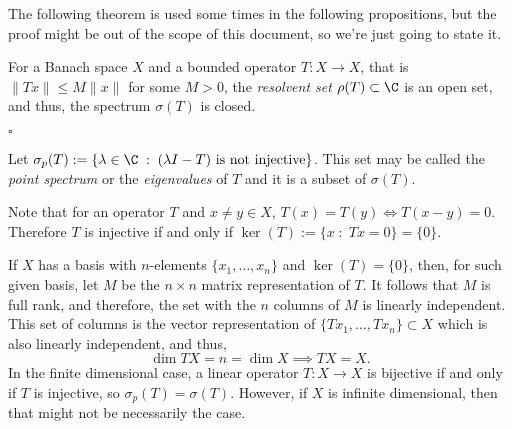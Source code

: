 The following theorem is used some times in the following propositions, but the proof might be out of the scope of this document, so we're just going to state it.

\begin{theorem}
    For a Banach space $X$ and a bounded operator $T: X \to X$, that is $\|Tx\| \leq M \|x\|$ for some $M> 0$, the \textit{resolvent set} $\rho(T) \subset \C$ is an open set, and thus, the spectrum $\sigma(T)$ is closed.
\end{theorem}

$ $\hfill $\square$

\begin{definition} 
    Let $\sigma_p(T) := \{\lambda \in \C \;:\; (\lambda I - T) \mbox{ is not injective}\}$. This set may be called the \textit{point spectrum} or the \textit{eigenvalues} of $T$ and it is a subset of $\sigma(T)$.
\end{definition}

Note that for an operator $T$ and $x \neq y \in X$, $T(x) = T(y) \iff T(x-y) = 0$. Therefore $T$ is injective if and only if $\ker(T) := \{x \;:\; Tx = 0\} = \{0\}$.

\begin{remark}
    If $X$ has a basis with $n$-elements $\{x_1, \ldots, x_n\}$ and $\ker(T) = \{0\}$, then, for such given basis, let $M$ be the $n\times n$ matrix representation of $T$. It follows that $M$ is full rank, and therefore, the set with the $n$ columns of $M$ is linearly independent. This set of columns is the vector representation of $\{Tx_1, \ldots, Tx_n\} \subset X$ which is also linearly independent, and thus, 
    \[ \dim TX = n = \dim X \implies TX = X. \]
    In the finite dimensional case, a linear operator $T: X \to X$ is bijective if and only if $T$ is injective, so $\sigma_p(T) = \sigma(T)$. However, if $X$ is infinite dimensional, then that might not be necessarily the case.
\end{remark}

